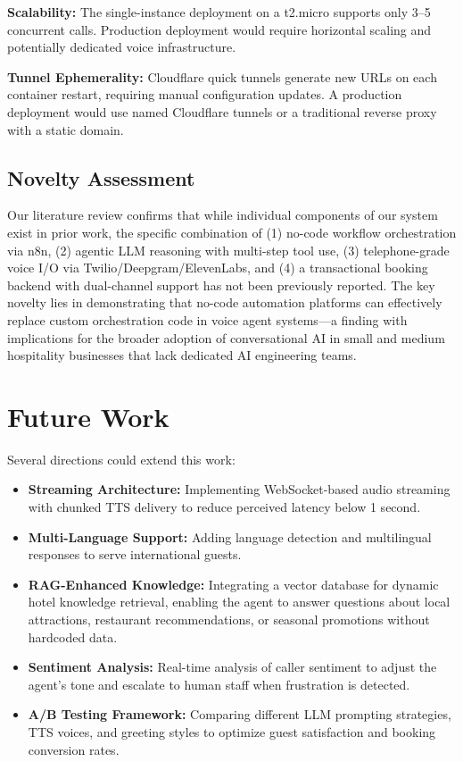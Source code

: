 \documentclass[conference]{IEEEtran}
\begin{document}
\textbf{Scalability:} The single-instance deployment on a t2.micro supports only 3--5 concurrent calls. Production deployment would require horizontal scaling and potentially dedicated voice infrastructure.

\textbf{Tunnel Ephemerality:} Cloudflare quick tunnels generate new URLs on each container restart, requiring manual configuration updates. A production deployment would use named Cloudflare tunnels or a traditional reverse proxy with a static domain.

\subsection{Novelty Assessment}

Our literature review confirms that while individual components of our system exist in prior work, the specific combination of (1) no-code workflow orchestration via n8n, (2) agentic LLM reasoning with multi-step tool use, (3) telephone-grade voice I/O via Twilio/Deepgram/ElevenLabs, and (4) a transactional booking backend with dual-channel support has not been previously reported. The key novelty lies in demonstrating that no-code automation platforms can effectively replace custom orchestration code in voice agent systems---a finding with implications for the broader adoption of conversational AI in small and medium hospitality businesses that lack dedicated AI engineering teams.

\section{Future Work}

Several directions could extend this work:

\begin{itemize}
    \item \textbf{Streaming Architecture:} Implementing WebSocket-based audio streaming with chunked TTS delivery to reduce perceived latency below 1 second.
    \item \textbf{Multi-Language Support:} Adding language detection and multilingual responses to serve international guests.
    \item \textbf{RAG-Enhanced Knowledge:} Integrating a vector database for dynamic hotel knowledge retrieval, enabling the agent to answer questions about local attractions, restaurant recommendations, or seasonal promotions without hardcoded data.
    \item \textbf{Sentiment Analysis:} Real-time analysis of caller sentiment to adjust the agent's tone and escalate to human staff when frustration is detected.
    \item \textbf{A/B Testing Framework:} Comparing different LLM prompting strategies, TTS voices, and greeting styles to optimize guest satisfaction and booking conversion rates.
\end{itemize}
\end{document}
